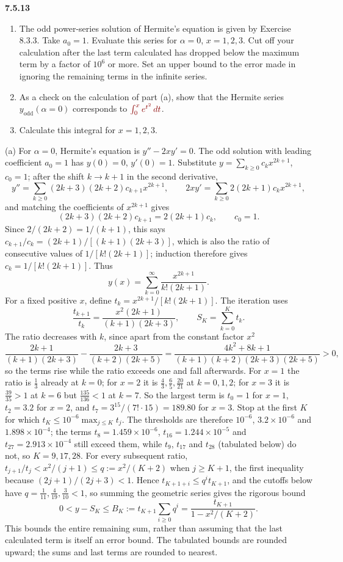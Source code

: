 \par\bigskip
\noindent\textbf{7.5.13}\quad
\begin{enumerate}
\item[(a)] The odd power-series solution of Hermite's equation is given by
  Exercise 8.3.3. Take $a_{0}=1$. Evaluate this series for $\alpha=0$,
  $x=1,2,3$. Cut off your calculation after the last term calculated has
  dropped below the maximum term by a factor of $10^{6}$ or more. Set an upper
  bound to the error made in ignoring the remaining terms in the infinite
  series.
\item[(b)] As a check on the calculation of part (a), show that the Hermite
  series $y_{\mathrm{odd}}(\alpha=0)$ corresponds to
  $\erratum{\int_{0}^{x}e^{t^{2}}\,dt}$.
\item[(c)] Calculate this integral for $x=1,2,3$.
\end{enumerate}
\solution
(a) For $\alpha=0$, Hermite's equation is $y''-2xy'=0$.
The odd solution with leading coefficient $a_0=1$ has $y(0)=0$,
$y'(0)=1$. Substitute $y=\sum_{k\ge0}c_kx^{2k+1}$, $c_0=1$; after the
shift $k\to k+1$ in the second derivative,
\[
y''=\sum_{k\ge0}(2k+3)(2k+2)c_{k+1}x^{2k+1},\qquad
2xy'=\sum_{k\ge0}2(2k+1)c_kx^{2k+1},
\]
and matching the coefficients of $x^{2k+1}$ gives
\[
(2k+3)(2k+2)c_{k+1}=2(2k+1)c_k,
\qquad c_0=1.
\]
Since $2/(2k+2)=1/(k+1)$, this says
$c_{k+1}/c_k=(2k+1)/[(k+1)(2k+3)]$, which is also the ratio of
consecutive values of $1/[k!(2k+1)]$; induction therefore gives
$c_k=1/[k!(2k+1)]$. Thus
\[
\boxed{y(x)=\sum_{k=0}^\infty\frac{x^{2k+1}}{k!(2k+1)}}.
\]
For a fixed positive $x$, define $t_k=x^{2k+1}/[k!(2k+1)]$.
The iteration uses
\[
\frac{t_{k+1}}{t_k}=\frac{x^2(2k+1)}{(k+1)(2k+3)},\qquad
S_K=\sum_{k=0}^Kt_k.
\]
The ratio decreases with $k$, since apart from the constant factor $x^2$
\[
\frac{2k+1}{(k+1)(2k+3)}-\frac{2k+3}{(k+2)(2k+5)}
=\frac{4k^2+8k+1}{(k+1)(k+2)(2k+3)(2k+5)}>0,
\]
so the terms rise while the ratio exceeds one and fall afterwards. For
$x=1$ the ratio is $\frac13$ already at $k=0$; for $x=2$ it is
$\frac43,\frac65,\frac{20}{21}$ at $k=0,1,2$; for $x=3$ it is
$\frac{39}{35}>1$ at $k=6$ but $\frac{135}{136}<1$ at $k=7$. So the
largest term is $t_0=1$ for $x=1$, $t_2=3.2$ for $x=2$, and
$t_7=3^{15}/(7!\cdot15)=189.80$ for $x=3$.
Stop at the first $K$ for which $t_K\le10^{-6}\max_{j\le K}t_j$.
The thresholds are therefore $10^{-6}$, $3.2\times10^{-6}$ and
$1.898\times10^{-4}$; the terms $t_8=1.459\times10^{-6}$,
$t_{16}=1.244\times10^{-5}$ and $t_{27}=2.913\times10^{-4}$ still exceed
them, while $t_9$, $t_{17}$ and $t_{28}$ (tabulated below) do not, so
$K=9,17,28$.
For every subsequent ratio,
$t_{j+1}/t_j<x^2/(j+1)\le q:=x^2/(K+2)$ when $j\ge K+1$, the first
inequality because $(2j+1)/(2j+3)<1$. Hence $t_{K+1+i}\le q^it_{K+1}$,
and the cutoffs below have $q=\frac1{11},\frac4{19},\frac3{10}<1$, so
summing the geometric series gives the rigorous bound
\[
\boxed{0<y-S_K\le B_K:=t_{K+1}\sum_{i\ge0}q^i
=\frac{t_{K+1}}{1-x^2/(K+2)}}.
\]
This bounds the entire remaining sum, rather than assuming that the
last calculated term is itself an error bound. The tabulated bounds are
rounded upward; the sums and last terms are rounded to nearest.

